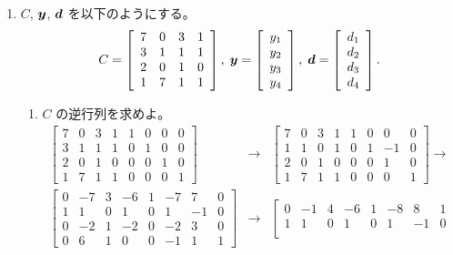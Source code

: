 \begin{enumerate}
\item $C$, $\mbox{\boldmath $y$}$, $\mbox{\boldmath $d$}$ を以下のようにする。
$$C = \left[\begin{array}{cccc} 7 & 0 & 3 & 1\\
3 & 1 & 1 & 1 \\ 2 & 0 & 1 & 0 \\ 1 & 7 & 1 & 1 \end{array}\right],
\;\mbox{\boldmath $y$} = \left[\begin{array}{c} y_1 \\ y_2 \\ y_3 \\ y_4 \end{array}\right],
\;\mbox{\boldmath $d$} = \left[\begin{array}{c} d_1 \\ d_2 \\ d_3 \\ d_4 \end{array}\right].$$
\begin{enumerate}
\item $C$ の逆行列を求めよ。\\
\sol
{\small \begin{eqnarray*}
\left[\begin{array}{cccc|cccc}
7 & 0 & 3 & 1 & 1 & 0 & 0 & 0 \\
3 & 1 & 1 & 1 & 0 & 1 & 0 & 0 \\
2 & 0 & 1 & 0 & 0 & 0 & 1 & 0 \\
1 & 7 & 1 & 1 & 0 & 0 & 0 & 1\end{array}\right] & \to &   
\left[\begin{array}{cccc|cccc}
7 & 0 & 3 & 1 & 1 & 0 & 0 & 0 \\
1 & 1 & 0 & 1 & 0 & 1 & -1 & 0 \\
2 & 0 & 1 & 0 & 0 & 0 & 1 & 0 \\
1 & 7 & 1 & 1 & 0 & 0 & 0 & 1 
\end{array}\right] \to \\
\left[\begin{array}{cccc|cccc}
0 & -7 & 3 &-6 & 1 & -7 & 7 & 0 \\
1 & 1 & 0 & 1 & 0 & 1 & -1 & 0 \\
0 & -2 & 1 & -2 & 0 & -2 & 3 & 0 \\
0 & 6 & 1 & 0 & 0 & -1 & 1 & 1 \end{array}\right] & \to &
\left[\begin{array}{cccc|cccc}
0 & -1 & 4 & -6 & 1 & -8 & 8 & 1 \\
1 & 1 & 0 & 1 & 0 & 1 & -1 & 0 \\

\end{array}
\end{eqnarray*}}
\end{enumerate}
\end{enumerate}
